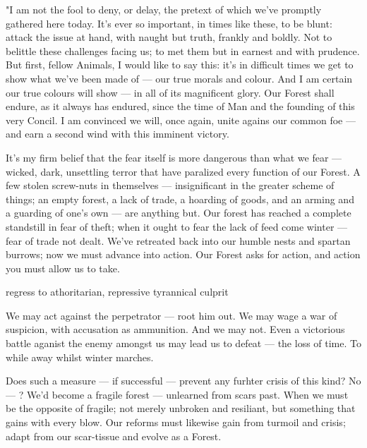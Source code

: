 
"I am not the fool to deny, or delay, the pretext of which we've promptly gathered here today. It's ever so important, in times like these, to be blunt: attack the issue at hand, with naught but truth, frankly and boldly. Not to belittle these challenges facing us; to met them but in earnest and with prudence.
But first, fellow Animals, I would like to say this: it's in difficult times we get to show what we've been made of — our true morals and colour. And I am certain our true colours will show — in all of its magnificent glory. Our Forest shall endure, as it always has endured, since the time of Man and the founding of this very Concil. I am convinced we will, once again, unite agains our common foe — and earn a second wind with this imminent victory.

It's my firm belief that the fear itself is more dangerous than what we fear — wicked, dark, unsettling terror that have paralized every function of our Forest. A few stolen screw-nuts in themselves — insignificant in the greater scheme of things; an empty forest, a lack of trade, a hoarding of goods, and an arming and a guarding of one's own — are anything but. Our forest has reached a complete standstill in fear of theft; when it ought to fear the lack of feed come winter — fear of trade not dealt. We've retreated back into our humble nests and spartan burrows; now we must advance into action. Our Forest asks for action, and action you must allow us to take.

regress to athoritarian, repressive tyrannical culprit

We may act against the perpetrator — root him out. We may wage a war of suspicion, with accusation as ammunition. And we may not. Even a victorious battle aganist the enemy amongst us may lead us to defeat — the loss of time. To while away whilst winter marches.

Does such a measure — if successful — prevent any furhter crisis of this kind? No — ? We'd become a fragile forest — unlearned from scars past. When we must be the opposite of fragile; not merely unbroken and resiliant, but something that gains with every blow. 
Our reforms must likewise gain from turmoil and crisis; adapt from our scar-tissue and evolve as a Forest.

